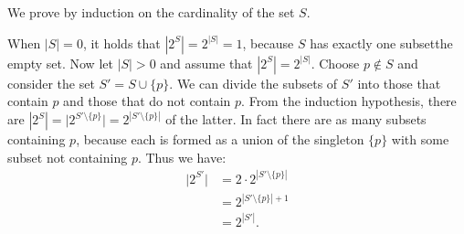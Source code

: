 \exercise
We prove by induction on the cardinality of the set $S$.

When $|S|=0$, it holds that $|2^S|=2^{|S|}=1$, because $S$ has exactly one subset\dash the empty set.
Now let $|S|>0$ and assume that $|2^S|=2^{|S|}$.
Choose $p\notin S$ and consider the set $S'=S\cup\{p\}$.
We can divide the subsets of $S'$ into those that contain $p$ and those that do not contain $p$.
From the induction hypothesis, there are $|2^S|=\bigl|2^{S'\setminus\{p\}}\bigr|=2^{|S'\setminus\{p\}|}$ of the latter.
In fact there are as many subsets containing $p$, because each is formed as a union of the singleton $\{p\}$ with some subset not containing $p$.
Thus we have:
\begin{align*}
    \bigl|2^{S'}\bigr| &= 2\cdot2^{|S'\setminus\{p\}|} \\
    &= 2^{|S'\setminus\{p\}|+1} \\
    &= 2^{|S'|}.
\end{align*}
